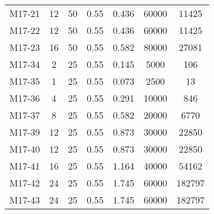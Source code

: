 \begin{table}
\begin{ruledtabular}
\begin{tabular}{lcccccc}
 M17-21 &  12 &  50 &  0.55 &  0.436 &  60000 &  11425 \\
 M17-22 &  12 &  50 &  0.55 &  0.436 &  60000 &  11425 \\
 M17-23 &  16 &  50 &  0.55 &  0.582 &  80000 &  27081 \\
 M17-34 &   2 &  25 &  0.55 &  0.145 &   5000 &    106 \\
 M17-35 &   1 &  25 &  0.55 &  0.073 &   2500 &     13 \\
 M17-36 &   4 &  25 &  0.55 &  0.291 &  10000 &    846 \\
 M17-37 &   8 &  25 &  0.55 &  0.582 &  20000 &   6770 \\
 M17-39 &  12 &  25 &  0.55 &  0.873 &  30000 &  22850 \\
 M17-40 &  12 &  25 &  0.55 &  0.873 &  30000 &  22850 \\
 M17-41 &  16 &  25 &  0.55 &  1.164 &  40000 &  54162 \\
 M17-42 &  24 &  25 &  0.55 &  1.745 &  60000 &  182797 \\
 M17-43 &  24 &  25 &  0.55 &  1.745 &  60000 &  182797 \\
\end{tabular}
\end{ruledtabular}
\end{table}

